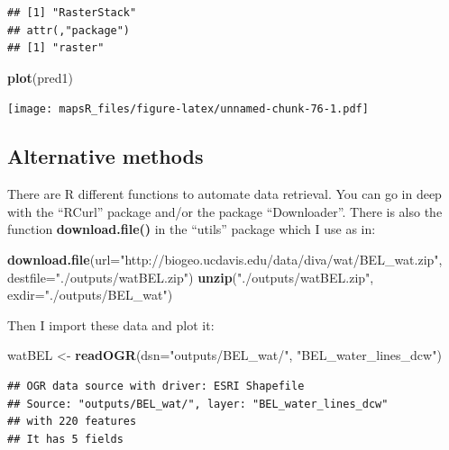 \documentclass[]{report}
\newenvironment{Shaded}{\begin{snugshade}}{\end{snugshade}}
\newcommand{\KeywordTok}[1]{\textcolor[rgb]{0.13,0.29,0.53}{\textbf{{#1}}}}
\newcommand{\DataTypeTok}[1]{\textcolor[rgb]{0.13,0.29,0.53}{{#1}}}
\newcommand{\StringTok}[1]{\textcolor[rgb]{0.31,0.60,0.02}{{#1}}}
\newcommand{\NormalTok}[1]{{#1}}
\begin{document}
\begin{verbatim}
## [1] "RasterStack"
## attr(,"package")
## [1] "raster"
\end{verbatim}

\begin{Shaded}
\begin{Highlighting}[]
\KeywordTok{plot}\NormalTok{(pred1)}
\end{Highlighting}
\end{Shaded}

\texttt{[image: mapsR\_files/figure-latex/unnamed-chunk-76-1.pdf]}

\subsection{Alternative methods}\label{alternative-methods}

There are R different functions to automate data retrieval. You can go
in deep with the ``RCurl'' package and/or the package ``Downloader''.
There is also the function \textbf{download.file()} in the ``utils''
package which I use as in:

\begin{Shaded}
\begin{Highlighting}[]
\KeywordTok{download.file}\NormalTok{(}\DataTypeTok{url=}\StringTok{"http://biogeo.ucdavis.edu/data/diva/wat/BEL_wat.zip"}\NormalTok{, }\DataTypeTok{destfile=}\StringTok{"./outputs/watBEL.zip"}\NormalTok{)}
\KeywordTok{unzip}\NormalTok{(}\StringTok{"./outputs/watBEL.zip"}\NormalTok{, }\DataTypeTok{exdir=}\StringTok{"./outputs/BEL_wat"}\NormalTok{)}
\end{Highlighting}
\end{Shaded}

Then I import these data and plot it:

\begin{Shaded}
\begin{Highlighting}[]
\NormalTok{watBEL <-}\StringTok{ }\KeywordTok{readOGR}\NormalTok{(}\DataTypeTok{dsn=}\StringTok{"outputs/BEL_wat/"}\NormalTok{, }\StringTok{"BEL_water_lines_dcw"}\NormalTok{)}
\end{Highlighting}
\end{Shaded}

\begin{verbatim}
## OGR data source with driver: ESRI Shapefile 
## Source: "outputs/BEL_wat/", layer: "BEL_water_lines_dcw"
## with 220 features
## It has 5 fields
\end{verbatim}
\end{document}
